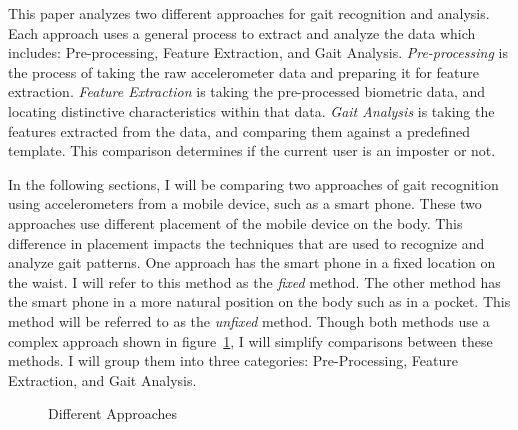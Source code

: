 \documentclass{sig-alternate}
\begin{document}
	This paper analyzes two different approaches for gait recognition and analysis. Each approach uses a general process to extract and analyze the data which includes: Pre-processing, Feature Extraction, and Gait Analysis. \textit{Pre-processing} is the process of taking the raw accelerometer data and preparing it for feature extraction. \textit{Feature Extraction} is taking the pre-processed biometric data, and locating distinctive characteristics within that data. \textit{Gait Analysis} is taking the features extracted from the data, and comparing them against a predefined template. This comparison determines if the current user is an imposter or not.

	In the following sections, I will be comparing two approaches of gait recognition using accelerometers from a mobile device, such as a smart phone. These two approaches use different placement of the mobile device on the body. This difference in placement impacts the techniques that are used to recognize and analyze gait patterns. One approach has the smart phone in a fixed location on the waist. I will refer to this method as the \textit{fixed} method. The other method has the smart phone in a more natural position on the body such as in a pocket. This method will be referred to as the \textit{unfixed} method. Though both methods use a complex approach shown in figure~\ref{fig:AlgorithmProcess}, I will simplify comparisons between these methods. I will group them into three categories: Pre-Processing, Feature Extraction, and Gait Analysis. 
	
\begin{figure}
\centering
{}
\caption{Different Approaches}
\label{fig:AlgorithmProcess}
\end{figure}	



\end{document}

